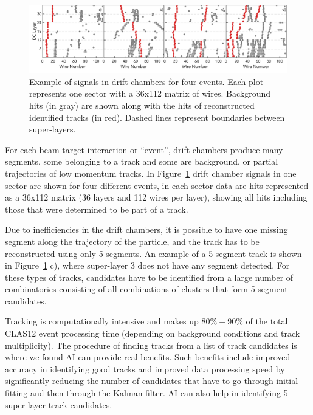 \documentclass[aps,prl,preprint,12pt]{elsarticle}
\begin{document}
\begin{figure}[!ht]
\begin{center}
 \includegraphics[width=6.2in]{images/figure_dc_examples.pdf}
\caption {Example of signals in drift chambers for four events. Each plot represents one sector with a 
36x112 matrix of wires. Background hits (in gray) are shown along with the hits of reconstructed 
identified tracks (in red). Dashed lines represent boundaries between super-layers.}
 \label{dc:events_sector}
 \end{center}
\end{figure}

For each beam-target interaction or ``event'', drift chambers produce many segments, some belonging 
to a track and some are background, or partial trajectories of low momentum tracks. In Figure~\ref{dc:events_sector} 
drift chamber signals in one sector are shown for four different  events, in each sector data are hits 
represented as a 36x112 matrix (36 layers and 112 wires per layer), showing all hits including those that 
were determined to be part of a track. 

Due to inefficiencies in the drift chambers, it is possible to have one missing segment along the trajectory 
of the particle, and the track has to be reconstructed using only 5 segments. An example of a 5-segment 
track is shown in Figure~\ref{dc:events_sector} c), where super-layer 3 does not have any segment detected. 
For these types of tracks, candidates have to be identified from a large number of combinatorics consisting 
of all combinations of clusters that form 5-segment candidates. 

Tracking is computationally intensive and makes up $80\%-90\%$ of the total CLAS12 event processing 
time (depending on background conditions and track multiplicity). The procedure of finding tracks from a 
list of track candidates is where we found AI can provide real benefits. Such benefits include improved 
accuracy in identifying good tracks and improved data processing speed by significantly reducing the 
number of candidates that have to go through initial fitting and then through the Kalman filter. AI can also 
help in identifying 5 super-layer track candidates.
\end{document}
